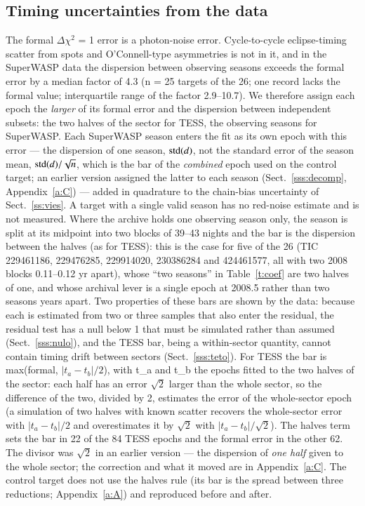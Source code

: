 \documentclass{aa}
\begin{document}
\subsection{Timing uncertainties from the data}\label{ss:barras}
The formal $\Delta\chi^2$ = 1 error is a photon-noise error. Cycle-to-cycle eclipse-timing scatter from spots and O'Connell-type asymmetries is not in it, and in the SuperWASP data the dispersion between observing seasons exceeds the formal error by a median factor of 4.3 (n = 25 targets of the 26; one record lacks the formal value; interquartile range of the factor 2.9--10.7). We therefore assign each epoch the \textit{larger} of its formal error and the dispersion between independent subsets: the two halves of the sector for TESS, the observing seasons for SuperWASP. Each SuperWASP season enters the fit as its own epoch with this error --- the dispersion of one season, ${\rm std}(d)$, not the standard error of the season mean, ${\rm std}(d)/\sqrt{n}$, which is the bar of the \textit{combined} epoch used on the control target; an earlier version assigned the latter to each season (Sect.~\ref{sss:decomp}, Appendix~\ref{a:C}) --- added in quadrature to the chain-bias uncertainty of Sect.~\ref{ss:vies}. A target with a single valid season has no red-noise estimate and is not measured. Where the archive holds one observing season only, the season is split at its midpoint into two blocks of 39--43 nights and the bar is the dispersion between the halves (as for TESS): this is the case for five of the 26 (TIC 229461186, 229476285, 229914020, 230386284 and 424461577, all with two 2008 blocks 0.11--0.12 yr apart), whose ``two seasons'' in Table~\ref{t:coef} are two halves of one, and whose archival lever is a single epoch at 2008.5 rather than two seasons years apart. Two properties of these bars are shown by the data: because each is estimated from two or three samples that also enter the residual, the residual test has a null below 1 that must be simulated rather than assumed (Sect.~\ref{sss:nulo}), and the TESS bar, being a within-sector quantity, cannot contain timing drift between sectors (Sect.~\ref{sss:teto}). For TESS the bar is max(formal, $|t_a - t_b|/2$), with t\_a and t\_b the epochs fitted to the two halves of the sector: each half has an error $\sqrt{2}$ larger than the whole sector, so the difference of the two, divided by 2, estimates the error of the whole-sector epoch (a simulation of two halves with known scatter recovers the whole-sector error with $|t_a - t_b|/2$ and overestimates it by $\sqrt{2}$ with $|t_a - t_b|/\sqrt{2}$). The halves term sets the bar in 22 of the 84 TESS epochs and the formal error in the other 62. The divisor was $\sqrt{2}$ in an earlier version --- the dispersion of \textit{one half} given to the whole sector; the correction and what it moved are in Appendix~\ref{a:C}. The control target does not use the halves rule (its bar is the spread between three reductions; Appendix~\ref{a:A}) and reproduced before and after.
\end{document}

